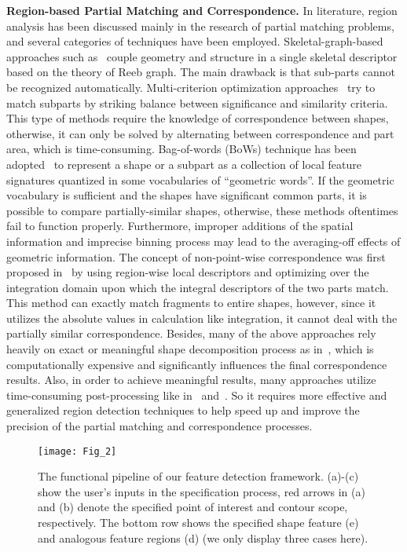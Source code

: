 \textbf{Region-based Partial Matching and Correspondence.} In
literature, region analysis has been discussed mainly in the research
of partial matching problems, and several categories of techniques
have been employed. Skeletal-graph-based approaches such
as~\cite{Biasotti:2006} couple geometry and structure in a single
skeletal descriptor based on the theory of Reeb graph. The main
drawback is that sub-parts cannot be recognized automatically.
Multi-criterion optimization
approaches~\cite{Bronstein:2008,Castellani:2008,Lavoue:2011} try to
match subparts by striking balance between significance and
similarity criteria. This type of methods require the knowledge of
correspondence between shapes, otherwise, it can only be solved by
alternating between correspondence and part area, which is
time-consuming. Bag-of-words (BoWs) technique has been
adopted~\cite{Zaharescu2009,Bronstein:2010:CVPR} to represent a shape or a
subpart as a collection of local feature signatures quantized in some
vocabularies of ``geometric words''. If the geometric vocabulary is
sufficient and the shapes have significant common parts, it is
possible to compare partially-similar shapes, otherwise, these
methods oftentimes fail to function properly. Furthermore, improper
additions of the spatial information and imprecise binning process
may lead to the averaging-off effects of geometric information. The
concept of non-point-wise correspondence was first proposed
in~\cite{Bronstein:2013} by using region-wise local descriptors and
optimizing over the integration domain upon which the integral
descriptors of the two parts match. This method can exactly match
fragments to entire shapes, however, since it utilizes the absolute
values in calculation like integration, it cannot deal with the
partially similar correspondence. Besides, many of the above
approaches rely heavily on exact or meaningful shape decomposition
process as in~\cite{Itskovich2011,Lavoue:2012}, which is
computationally expensive and significantly influences the final
correspondence results. Also, in order to achieve meaningful results,
many approaches utilize time-consuming post-processing like
in~\cite{Gal2006} and~\cite{Itskovich2011}. So it requires more
effective and generalized region detection techniques to help speed
up and improve the precision of the partial matching and
correspondence processes.

\begin{figure*}
\begin{center}
\texttt{[image: Fig\_2]}
\end{center}
\caption[Illustration of the steps of our feature detection framework.]
  {The functional pipeline of our feature detection framework.
  (a)-(c) show the user's inputs in the specification process, red
  arrows in (a) and (b) denote the specified point of interest and
  contour scope, respectively. The bottom row shows the specified
  shape feature (e) and analogous feature regions (d) (we only
  display three cases here).}
\label{specification}
\end{figure*}

